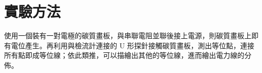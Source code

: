 \section{\textbf{實驗方法}}
使用一個裝有一對電極的碳質畫板，與串聯電阻並聯後接上電源，則碳質畫板上即有電位產生。再利用與檢流計連接的 U 形探針接觸碳質畫板，測出等位點，連接所有點即成等位線；依此類推，可以描繪出其他的等位線，進而繪出電力線的分佈。
